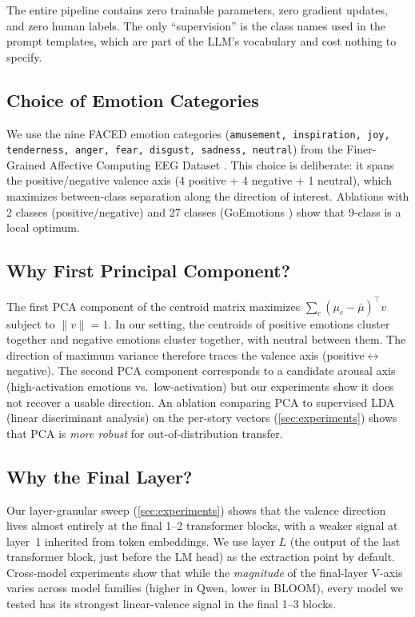 The entire pipeline contains zero trainable parameters, zero gradient updates,
and zero human labels. The only ``supervision'' is the class names used in the
prompt templates, which are part of the LLM's vocabulary and cost nothing
to specify.

\subsection{Choice of Emotion Categories}

We use the nine FACED emotion categories
(\texttt{amusement, inspiration, joy, tenderness, anger, fear, disgust,
sadness, neutral}) from the Finer-Grained Affective Computing EEG Dataset
\cite{liu2024faced}. This choice is deliberate: it spans the positive/negative
valence axis (4 positive + 4 negative + 1 neutral), which maximizes between-class
separation along the direction of interest. Ablations with 2 classes
(positive/negative) and 27 classes (GoEmotions
\cite{demszky2020goemotions}) show that 9-class is a local optimum.

\subsection{Why First Principal Component?}

The first PCA component of the centroid matrix maximizes
$\sum_c (\mu_c - \bar\mu)^\top v$ subject to $\|v\| = 1$. In our setting,
the centroids of positive emotions cluster together and negative emotions
cluster together, with neutral between them. The direction of maximum
variance therefore traces the valence axis (positive$\leftrightarrow$negative).
The second PCA component corresponds to a candidate arousal axis
(high-activation emotions vs.\ low-activation) but our experiments show it
does not recover a usable direction. An ablation comparing PCA to supervised
LDA (linear discriminant analysis) on the per-story vectors
(\cref{sec:experiments}) shows that PCA is \emph{more robust} for
out-of-distribution transfer.

\subsection{Why the Final Layer?}

Our layer-granular sweep (\cref{sec:experiments}) shows that the valence
direction lives almost entirely at the final 1--2 transformer blocks, with
a weaker signal at layer~1 inherited from token embeddings. We use layer
$L$ (the output of the last transformer block, just before the LM head)
as the extraction point by default. Cross-model experiments show that
while the \emph{magnitude} of the final-layer V-axis varies across model
families (higher in Qwen, lower in BLOOM), every model we tested has its
strongest linear-valence signal in the final 1--3 blocks.

